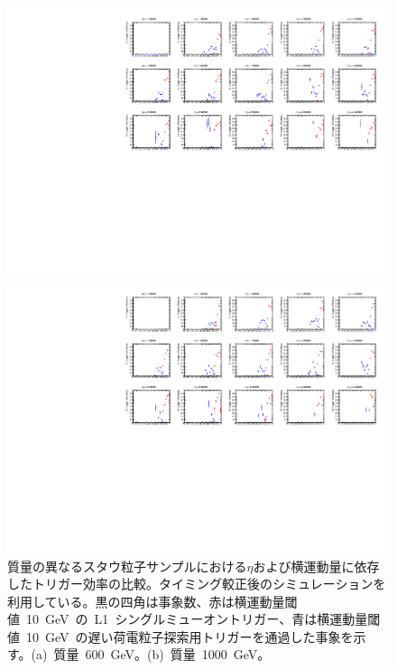 \begin{figure}[tbp]
    \begin{minipage}{0.49\hsize}
    \centering   
    \includegraphics[width=\textwidth,page=14]{img/rec/stau_600.pdf}
    \subcaption{}
    \end{minipage}
    \begin{minipage}{0.49\hsize}
    \centering   
    \includegraphics[width=\textwidth,page=14]{img/rec/stau_1000.pdf}
    \subcaption{}
    \end{minipage}
    \caption[質量の異なるスタウ粒子サンプルにおける$\eta$および横運動量に依存したトリガー効率の比較]{質量の異なるスタウ粒子サンプルにおける$\eta$および横運動量に依存したトリガー効率の比較。タイミング較正後のシミュレーションを利用している。黒の四角は事象数、赤は横運動量閾値~10~GeV~の~L1~シングルミューオントリガー、青は横運動量閾値~10~GeV~の遅い荷電粒子探索用トリガーを通過した事象を示す。(a)~質量~600~GeV。(b)~質量~1000~GeV。}\label{fig:tripteta6}
\end{figure}
